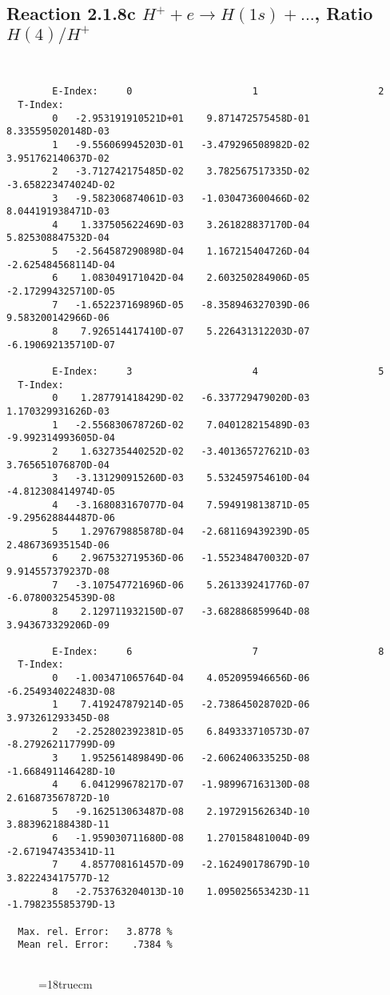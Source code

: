 \subsection{
Reaction 2.1.8c  $H^+ + e \rightarrow H(1s) + ...$,  Ratio $H(4)/H^+$
}

\begin{verbatim}


        E-Index:     0                     1                     2
  T-Index:
        0   -2.953191910521D+01    9.871472575458D-01    8.335595020148D-03
        1   -9.556069945203D-01   -3.479296508982D-02    3.951762140637D-02
        2   -3.712742175485D-02    3.782567517335D-02   -3.658223474024D-02
        3   -9.582306874061D-03   -1.030473600466D-02    8.044191938471D-03
        4    1.337505622469D-03    3.261828837170D-04    5.825308847532D-04
        5   -2.564587290898D-04    1.167215404726D-04   -2.625484568114D-04
        6    1.083049171042D-04    2.603250284906D-05   -2.172994325710D-05
        7   -1.652237169896D-05   -8.358946327039D-06    9.583200142966D-06
        8    7.926514417410D-07    5.226431312203D-07   -6.190692135710D-07

        E-Index:     3                     4                     5
  T-Index:
        0    1.287791418429D-02   -6.337729479020D-03    1.170329931626D-03
        1   -2.556830678726D-02    7.040128215489D-03   -9.992314993605D-04
        2    1.632735440252D-02   -3.401365727621D-03    3.765651076870D-04
        3   -3.131290915260D-03    5.532459754610D-04   -4.812308414974D-05
        4   -3.168083167077D-04    7.594919813871D-05   -9.295628844487D-06
        5    1.297679885878D-04   -2.681169439239D-05    2.486736935154D-06
        6    2.967532719536D-06   -1.552348470032D-07    9.914557379237D-08
        7   -3.107547721696D-06    5.261339241776D-07   -6.078003254539D-08
        8    2.129711932150D-07   -3.682886859964D-08    3.943673329206D-09

        E-Index:     6                     7                     8
  T-Index:
        0   -1.003471065764D-04    4.052095946656D-06   -6.254934022483D-08
        1    7.419247879214D-05   -2.738645028702D-06    3.973261293345D-08
        2   -2.252802392381D-05    6.849333710573D-07   -8.279262117799D-09
        3    1.952561489849D-06   -2.606240633525D-08   -1.668491146428D-10
        4    6.041299678217D-07   -1.989967163130D-08    2.616873567872D-10
        5   -9.162513063487D-08    2.197291562634D-10    3.883962188438D-11
        6   -1.959030711680D-08    1.270158481004D-09   -2.671947435341D-11
        7    4.857708161457D-09   -2.162490178679D-10    3.822243417577D-12
        8   -2.753763204013D-10    1.095025653423D-11   -1.798235585379D-13

  Max. rel. Error:   3.8778 %
  Mean rel. Error:    .7384 %


\end{verbatim}
\begin{figure} \label{2.1.8rc}
\epsfxsize=18truecm
\end{figure}
\newpage



